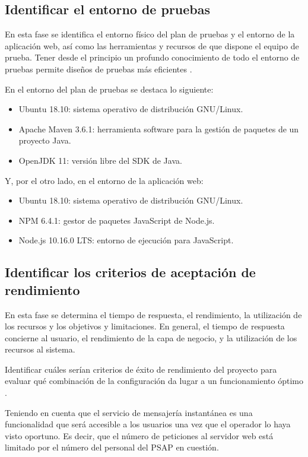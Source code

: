 \subsection{Identificar el entorno de pruebas}

En esta fase se identifica el entorno físico del plan de pruebas y el entorno de la aplicación web, así como las herramientas y recursos de que dispone el equipo de prueba. Tener desde el principio un profundo conocimiento de todo el entorno de pruebas permite diseños de pruebas más eficientes \cite{jmeter6}.

En el entorno del plan de pruebas se destaca lo siguiente:

\begin{itemize}
  \item Ubuntu 18.10: sistema operativo de distribución GNU/Linux.
  \item Apache Maven 3.6.1: herramienta software para la gestión de paquetes de un proyecto Java.
  \item OpenJDK 11: versión libre del SDK de Java.
\end{itemize}

Y, por el otro lado, en el entorno de la aplicación web:

\begin{itemize}
  \item Ubuntu 18.10: sistema operativo de distribución GNU/Linux.
  \item NPM 6.4.1: gestor de paquetes JavaScript de Node.js.
  \item Node.js 10.16.0 LTS: entorno de ejecución para JavaScript.
\end{itemize}

\subsection{Identificar los criterios de aceptación de rendimiento}

En esta fase se determina el tiempo de respuesta, el rendimiento, la utilización de los recursos y los objetivos y limitaciones. En general, el tiempo de respuesta concierne al usuario, el rendimiento de la capa de negocio, y la utilización de los recursos al sistema.

Identificar cuáles serían criterios de éxito de rendimiento del proyecto para evaluar qué combinación de la configuración da lugar a un funcionamiento óptimo \cite{jmeter6}.

Teniendo en cuenta que el servicio de mensajería instantánea es una funcionalidad que será accesible a los usuarios una vez que el operador lo haya visto oportuno. Es decir, que el número de peticiones al servidor web está limitado por el número del personal del PSAP en cuestión.

